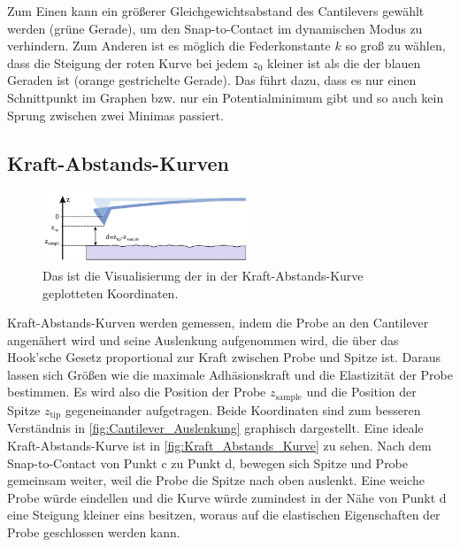     Zum Einen kann ein größerer Gleichgewichtsabstand des Cantilevers gewählt werden (grüne Gerade), um den Snap-to-Contact im dynamischen Modus zu verhindern.
    Zum Anderen ist es möglich die Federkonstante $k$ so groß zu wählen, dass die Steigung der roten Kurve bei jedem $z_0$ kleiner ist als die der blauen Geraden ist (orange gestrichelte Gerade).
    Das führt dazu, dass es nur einen Schnittpunkt im Graphen bzw. nur ein Potentialminimum gibt und so auch kein Sprung zwischen zwei Minimas passiert.

\subsection{Kraft-Abstands-Kurven}
    \begin{figure}[ht]
        \centering\captionsetup{format=plain}
        \includegraphics[width=0.55\textwidth]{bilder/Cantilever_Auslenkung.png}
        \caption{Das ist die Visualisierung der in der Kraft-Abstands-Kurve geplotteten Koordinaten.}
        \label{fig:Cantilever_Auslenkung}
    \end{figure}
    \FloatBarrier
    Kraft-Abstands-Kurven werden gemessen, indem die Probe an den Cantilever angenähert wird und seine Auslenkung aufgenommen wird, die über das Hook'sche Gesetz proportional zur Kraft zwischen Probe und Spitze ist.
    Daraus lassen sich Größen wie die maximale Adhäsionskraft und die Elastizität der Probe bestimmen.
    Es wird also die Position der Probe $z_{\mathrm{sample}}$ und die Position der Spitze $z_{\mathrm{tip}}$ gegeneinander aufgetragen.
    Beide Koordinaten sind zum besseren Verständnis in \autoref{fig:Cantilever_Auslenkung} graphisch dargestellt.
    Eine ideale Kraft-Abstands-Kurve ist in \autoref{fig:Kraft_Abstands_Kurve} zu sehen.
    Nach dem Snap-to-Contact von Punkt c zu Punkt d, bewegen sich Spitze und Probe gemeinsam weiter, weil die Probe die Spitze nach oben auslenkt.
    Eine weiche Probe würde eindellen und die Kurve würde zumindest in der Nähe von Punkt d eine Steigung kleiner eins besitzen, woraus auf die elastischen Eigenschaften der Probe geschlossen werden kann.
